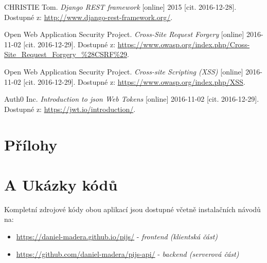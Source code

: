 \documentclass[a4paper,11pt,titlepage,fleqn]{article}
\begin{document}
\begin{thebibliography}{99}
        CHRISTIE Tom. \textit{Django REST framework} [online] 2015 [cit. 2016-12-28]. Dostupné z: \url{http://www.django-rest-framework.org/}.

       Open Web Application Security Project. \textit{Cross-Site Request Forgery} [online] 2016-11-02 [cit. 2016-12-29]. Dostupné z: \url{https://www.owasp.org/index.php/Cross-Site_Request_Forgery_%28CSRF%29}.

       Open Web Application Security Project. \textit{Cross-site Scripting (XSS)} [online] 2016-11-02 [cit. 2016-12-29]. Dostupné z: \url{https://www.owasp.org/index.php/XSS}.

       Auth0 Inc. \textit{Introduction to \gls{json} Web Tokens} [online] 2016-11-02 [cit. 2016-12-29]. Dostupné z: \url{https://jwt.io/introduction/}.
       
\end{thebibliography}

\newpage
\appendix

\thispagestyle{plain}
\section*{Přílohy}

\thispagestyle{plain}
\section*{A Ukázky kódů}

Kompletní zdrojové kódy obou aplikací jsou dostupné včetně instalačních návodů na:
\begin{itemize}
    \item \url{https://daniel-madera.github.io/pijs/} - \textit{frontend (klientská část)}
    \item \url{https://github.com/daniel-madera/pijs-api/} - \textit{backend (serverová část)}
\end{itemize}
\end{document}

